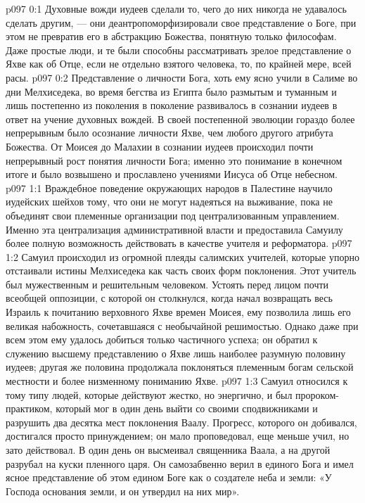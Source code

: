 \vs p097 0:1 Духовные вожди иудеев сделали то, чего до них никогда не удавалось сделать другим, --- они деантропоморфизировали свое представление о Боге, при этом не превратив его в абстракцию Божества, понятную только философам. Даже простые люди, и те были способны рассматривать зрелое представление о Яхве как об Отце, если не отдельно взятого человека, то, по крайней мере, всей расы.
\vs p097 0:2 Представление о личности Бога, хоть ему ясно учили в Салиме во дни Мелхиседека, во время бегства из Египта было размытым и туманным и лишь постепенно из поколения в поколение развивалось в сознании иудеев в ответ на учение духовных вождей. В своей постепенной эволюции гораздо более непрерывным было осознание личности Яхве, чем любого другого атрибута Божества. От Моисея до Малахии в сознании иудеев происходил почти непрерывный рост понятия личности Бога; именно это понимание в конечном итоге и было возвышено и прославлено учениями Иисуса об Отце небесном.
\vs p097 1:1 Враждебное поведение окружающих народов в Палестине научило иудейских шейхов тому, что они не могут надеяться на выживание, пока не объединят свои племенные организации под централизованным управлением. Именно эта централизация административной власти и предоставила Самуилу более полную возможность действовать в качестве учителя и реформатора.
\vs p097 1:2 Самуил происходил из огромной плеяды салимских учителей, которые упорно отстаивали истины Мелхиседека как часть своих форм поклонения. Этот учитель был мужественным и решительным человеком. Устоять перед лицом почти всеобщей оппозиции, с которой он столкнулся, когда начал возвращать весь Израиль к почитанию верховного Яхве времен Моисея, ему позволила лишь его великая набожность, сочетавшаяся с необычайной решимостью. Однако даже при всем этом ему удалось добиться только частичного успеха; он обратил к служению высшему представлению о Яхве лишь наиболее разумную половину иудеев; другая же половина продолжала поклоняться племенным богам сельской местности и более низменному пониманию Яхве.
\vs p097 1:3 Самуил относился к тому типу людей, которые действуют жестко, но энергично, и был пророком\hyp{}практиком, который мог в один день выйти со своими сподвижниками и разрушить два десятка мест поклонения Ваалу. Прогресс, которого он добивался, достигался просто принуждением; он мало проповедовал, еще меньше учил, но зато действовал. В один день он высмеивал священника Ваала, а на другой разрубал на куски пленного царя. Он самозабвенно верил в единого Бога и имел ясное представление об этом едином Боге как о создателе неба и земли: «У Господа основания земли, и он утвердил на них мир».
